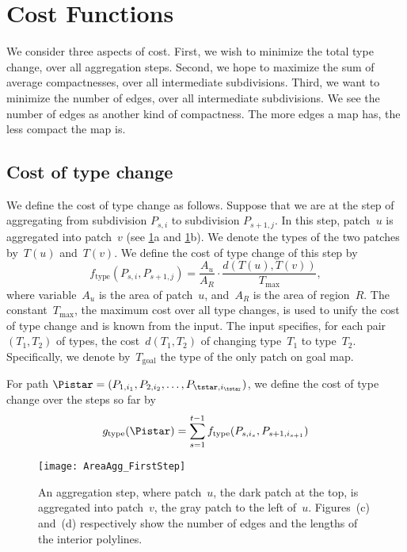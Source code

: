 \section{Cost Functions}
\label{sec:AreaAgg_CostFunctions}
We consider three aspects of cost. 
First, we wish to minimize the total type change, 
over all aggregation steps. 
Second, we hope to maximize the sum of average compactnesses,
over all intermediate subdivisions.
Third, we want to minimize the number of edges,
over all intermediate subdivisions.
We see the number of edges as another kind of compactness. 
The more edges a map has, the less compact the map is.

\subsection{Cost of type change}
We define the cost of type change as follows.
Suppose that we are at the step of 
aggregating from subdivision $P_{s,i}$ to subdivision 
$P_{s+1,j}$. 
In this step, patch~$u$ is aggregated into patch~$v$
(see \figs\ref{fig:AreaAgg_FirstStep}a 
and \ref{fig:AreaAgg_FirstStep}b).
We denote the types of the two patches by~$T(u)$ and~$T(v)$. 
We define the cost of type change of this step by
\begin{equation}
\label{eq:f_type}
f_\mathrm{type}(P_{s,i},P_{s+1,j})=\frac{A_{u}}{A_R}
\cdot
\frac{d(T(u),T(v))}{T_{\max}},
\end{equation}
where variable~$A_u$ is the area of patch~$u$, 
and~$A_R$ is the area of region~$R$.
The constant~$T_{\max}$, the maximum cost over all type changes, 
is used to unify the cost of type change 
and is known from the input. 
The input specifies, for each pair~$(T_1,T_2)$ of types, 
the cost~$d(T_1,T_2)$ of changing type~$T_1$ to type~$T_2$.
Specifically, we denote by~$T_\mathrm{goal}$ the type of 
the only patch on goal map.


For path $\Pistar=(P_{1,i_1}, P_{2,i_2}, \dots, 
P_{\tstar,i_{\tstar}})$,
we define the cost of type change over the steps so far by
\begin{equation}
\label{eq:g_type}
g_\mathrm{type}(\Pistar)=
\sum_{s=1}^{t-1}f_\mathrm{type}(P_{s,i_s},P_{s+1,i_{s+1}})
\end{equation}

\begin{figure}[tb]
	\centering
	\texttt{[image: AreaAgg\_FirstStep]}
	\caption{An aggregation step, 
	where patch~$u$, the dark patch at the top,
	is aggregated into patch~$v$, the gray patch to the left of~$u$.
	Figures~(c) and~(d) respectively show the number of edges and the lengths of the interior polylines.}
	\label{fig:AreaAgg_FirstStep}	
\end{figure}


